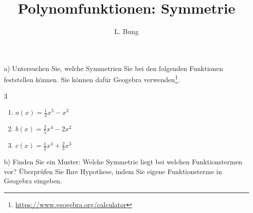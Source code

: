 \documentclass[11pt, a4paper, oneside]{article}
\begin{document}
	\author{L. Bung}
	\title{Polynomfunktionen: Symmetrie}
	\subject{Mathematik}
	\maketitle
	
	
	a) Untersuchen Sie, welche Symmetrien Sie bei den folgenden Funktionen feststellen können.
	Sie können dafür Geogebra verwenden\footnote{\url{https://www.geogebra.org/calculator}}.
	
	\begin{multicols}{3}
		\begin{enumerate}[label=]
			\item $a(x) = \frac{1}{3} x^5 - x^3$
			\item $b(x) = \frac{2}{5} x^4 - 2x^2$
			\item $c(x) = \frac{1}{2} x^4 + \frac{2}{3} x^3$
		\end{enumerate}
	\end{multicols}
	
	\checkered[7cm]
	
	b) Finden Sie ein Muster:
	Welche Symmetrie liegt bei welchen Funktionstermen vor?
	Überprüfen Sie Ihre Hypothese, indem Sie eigene Funktionsterme in Geogebra eingeben.
	
	\checkered[6cm]
	
\end{document}
